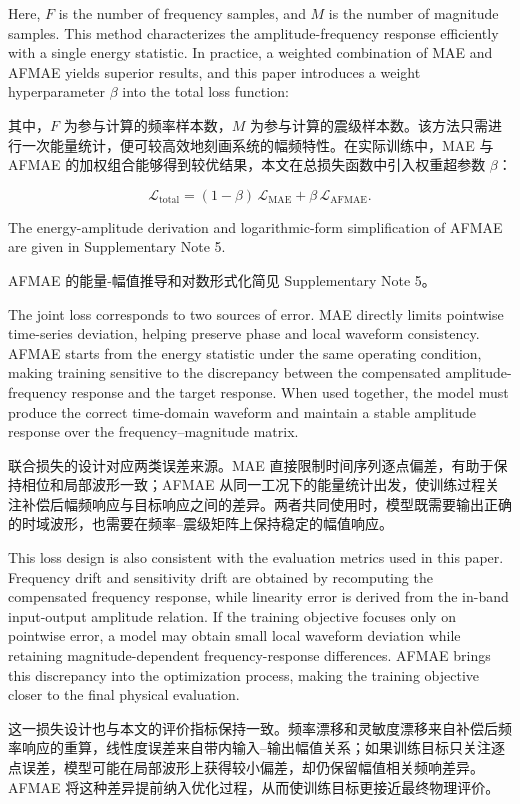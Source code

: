 \documentclass[sn-nature]{sn-jnl}
\newif\ifCNENEnglish
\newif\ifCNENBilingual
\newcommand{\CNEN}[2]{%
    \ifCNENBilingual
        #1%
        \if\relax\detokenize{#2}\relax\else\par #2\fi%
    \else
        \ifCNENEnglish
            #2%
        \else
            #1%
        \fi
    \fi
}
\newcommand{\fmax}{F} %
\newcommand{\mmax}{M} %
\newcommand{\wMAE}{\beta} %
\begin{document}
\CNEN{其中，$\fmax$ 为参与计算的频率样本数，$\mmax$ 为参与计算的震级样本数。该方法只需进行一次能量统计，便可较高效地刻画系统的幅频特性。在实际训练中，MAE 与 AFMAE 的加权组合能够得到较优结果，本文在总损失函数中引入权重超参数 $\wMAE$：}{Here, $\fmax$ is the number of frequency samples, and $\mmax$ is the number of magnitude samples. This method characterizes the amplitude-frequency response efficiently with a single energy statistic. In practice, a weighted combination of MAE and AFMAE yields superior results, and this paper introduces a weight hyperparameter $\wMAE$ into the total loss function:%
}

\begin{equation}
    \mathcal{L}_{\text{total}}
    = (1-\wMAE)\,\mathcal{L}_{\text{MAE}}
    + \wMAE\,\mathcal{L}_{\text{AFMAE}}.
    \label{eq:TotalLoss}
\end{equation}

\CNEN{AFMAE 的能量-幅值推导和对数形式化简见 Supplementary Note 5。}{The energy-amplitude derivation and logarithmic-form simplification of AFMAE are given in Supplementary Note 5.%
}

\CNEN{联合损失的设计对应两类误差来源。MAE 直接限制时间序列逐点偏差，有助于保持相位和局部波形一致；AFMAE 从同一工况下的能量统计出发，使训练过程关注补偿后幅频响应与目标响应之间的差异。两者共同使用时，模型既需要输出正确的时域波形，也需要在频率--震级矩阵上保持稳定的幅值响应。}{The joint loss corresponds to two sources of error. MAE directly limits pointwise time-series deviation, helping preserve phase and local waveform consistency. AFMAE starts from the energy statistic under the same operating condition, making training sensitive to the discrepancy between the compensated amplitude-frequency response and the target response. When used together, the model must produce the correct time-domain waveform and maintain a stable amplitude response over the frequency--magnitude matrix.}

\CNEN{这一损失设计也与本文的评价指标保持一致。频率漂移和灵敏度漂移来自补偿后频率响应的重算，线性度误差来自带内输入--输出幅值关系；如果训练目标只关注逐点误差，模型可能在局部波形上获得较小偏差，却仍保留幅值相关频响差异。AFMAE 将这种差异提前纳入优化过程，从而使训练目标更接近最终物理评价。}{This loss design is also consistent with the evaluation metrics used in this paper. Frequency drift and sensitivity drift are obtained by recomputing the compensated frequency response, while linearity error is derived from the in-band input-output amplitude relation. If the training objective focuses only on pointwise error, a model may obtain small local waveform deviation while retaining magnitude-dependent frequency-response differences. AFMAE brings this discrepancy into the optimization process, making the training objective closer to the final physical evaluation.}
\end{document}
